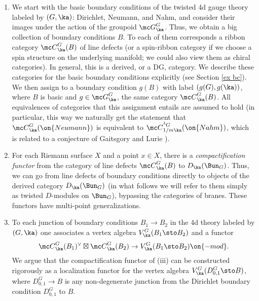 \documentclass[11pt,reqno]{amsart}
\theoremstyle{plain}
\numberwithin{equation}{section}
\newcommand{\Z}{\mathbb{Z}}
\def\neg{\negthinspace}
\def\LG{{}^L\neg G}
\theoremstyle{definition}
\begin{document}
\begin{enumerate}

\bigskip

\item We start with the basic boundary conditions of the twisted 4d
  gauge theory labeled by $(G,\ka)$: Dirichlet, Neumann, and Nahm, and
  consider their images under the action of the groupoid ${\mc
    G}^G_\ka$. Thus, we obtain a big collection of boundary conditions
  $B$. To each of them corresponds a ribbon category ${\mc
    C}^G_\ka(B)$ of line defects (or a spin-ribbon category if we
  choose a spin structure on the underlying manifold; we could also
  view them as chiral categories). In general, this is a derived, or a
  DG, category. We describe these categories for the basic boundary
  conditions explicitly (see Section \ref{ex bc}). We then assign to a
  boundary condition $g(B)$ with label $(g(G),g(\ka))$, where $B$ is
  basic and $g \in {\mc G}^G_\ka$, the same category ${\mc
    C}^G_\ka(B)$. All equivalences of categories that this assignment
  entails are assumed to hold (in particular, this way we naturally
  get the statement that ${\mc C}^G_\ka(\on{Neumann})$ is equivalent
  to ${\mc C}^{\LG}_{1/m\ka}(\on{Nahm})$, which is related to a
  conjecture of Gaitsgory and Lurie \cite{gaitsW,gaitsQ}).

\bigskip

\item For each Riemann surface $X$ and a point $x \in X$, there is a
  {\em compactification functor} from the category of line defects
  ${\mc C}^G_\ka(B)$ to $D_\ka(\Bun_G)$. Thus, we can go from line
  defects of boundary conditions directly to objects of the derived
  category $D_\ka(\Bun_G)$ (in what follows we will refer to them
  simply as twisted $D$-modules on $\Bun_G$), bypassing the categories
  of branes. These functors have multi-point generalizations.

\bigskip

\item To each junction of boundary conditions $B_1 \to B_2$ in the 4d
  theory labeled by $(G,\ka)$ one associates a vertex algebra
  $V^G_\ka(B_1 \sto B_2)$ and a functor
$$
{\mc C}^G_\ka(B_1)^\vee
  \boxtimes {\mc C}^G_\ka(B_2) \to V^G_\ka(B_1 \sto B_2)\on{-mod}.
$$
We argue that the compactification functor of (iii) can be constructed
rigorously as a localization functor for the vertex algebra
$V^G_\ka(D^G_{0,1} \sto B)$, where $D^G_{0,1} \to B$ is any
non-degenerate junction from the Dirichlet boundary condition
$D^G_{0,1}$ to $B$.


\end{enumerate}
\end{document}
